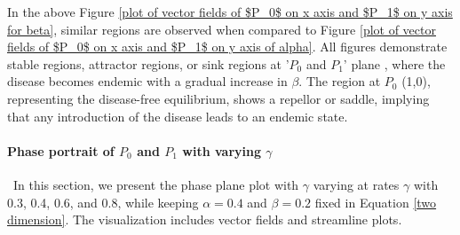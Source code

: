 \documentclass[paper=a4, fontsize=11pt, twoside, BCOR=12mm, parskip=full, listof=totoc]{scrreprt}
\begin{document}
{In the above Figure \ref{plot of vector fields of $P_0$ on x axis and $P_1$ on y axis for beta}, similar regions are observed when compared to Figure \ref{plot of vector fields of $P_0$ on x axis and $P_1$ on y axis of alpha}. All figures demonstrate stable regions, attractor regions, or sink regions at '\(P_0\) and \(P_1\)' plane , where the disease becomes endemic with a gradual increase in \(\beta\). The region at \(P_0\) (1,0), representing the disease-free equilibrium, shows a repellor or saddle, implying that any introduction of the disease leads to an endemic state.

\paragraph*{Phase portrait of $P_0$ and $P_1$ with varying $\gamma$}\
In this section, we present the phase plane plot with \(\gamma\) varying at rates \(\gamma\) with 0.3, 0.4, 0.6, and 0.8, while keeping \(\alpha = 0.4\) and \(\beta = 0.2\) fixed in Equation \ref{two dimension}. The visualization includes vector fields and streamline plots.
	
}
\end{document}
